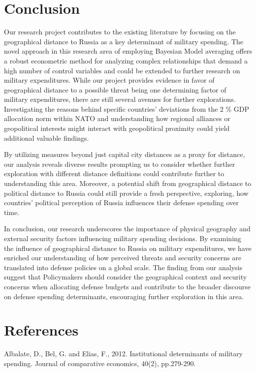 \documentclass[12pt,a4paper]{article}
\begin{document}
\section{Conclusion}
Our research project contributes to the existing literature by focusing on the geographical distance to Russia as a key determinant of military spending. The novel approach in this research area of employing Bayesian Model averaging offers a robust econometric method for analyzing complex relationships that demand a high number of control variables and could be extended to further research on military expenditures. 
While our project provides evidence in favor of geographical distance to a possible threat being one determining factor of military expenditures, there are still several avenues for further explorations. Investigating the reasons behind specific countries’ deviations from the 2 \% GDP allocation norm within NATO and understanding how regional alliances or geopolitical interests might interact with geopolitical proximity could yield additional valuable findings. 

By utilizing measures beyond just capital city distances as a proxy for distance, our analysis reveals diverse results prompting us to consider whether further exploration with different distance definitions could contribute further to understanding this area. Moreover, a potential shift from geographical distance to political distance to Russia could still provide a fresh perspective, exploring, how countries’ political perception of Russia influences their defense spending over time.

In conclusion, our research underscores the importance of physical geography and external security factors influencing military spending decisions. By examining the influence of geographical distance to Russia on military expenditures, we have enriched our understanding of how perceived threats and security concerns are translated into defense policies on a global scale. The finding from our analysis suggest that Policymakers should consider the geographical context and security concerns when allocating defense budgets and contribute to the broader discourse on defense spending determinants, encouraging further exploration in this area.  




\clearpage


\section{References}
Albalate, D., Bel, G. and Elias, F., 2012. Institutional determinants of military spending. Journal of comparative economics, 40(2), pp.279-290. \\
\end{document}
